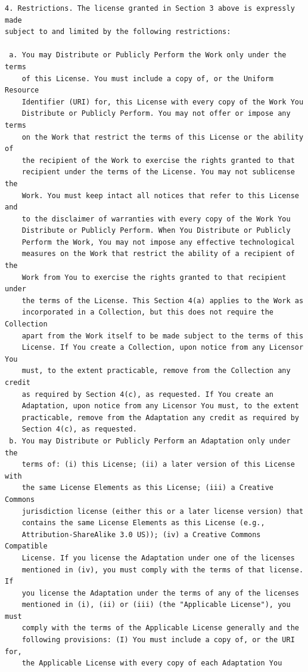 \documentclass[10pt]{book}              %
\begin{document}
\begin{appendices}
\begin{verbatim}
4. Restrictions. The license granted in Section 3 above is expressly made
subject to and limited by the following restrictions:

 a. You may Distribute or Publicly Perform the Work only under the terms
    of this License. You must include a copy of, or the Uniform Resource
    Identifier (URI) for, this License with every copy of the Work You
    Distribute or Publicly Perform. You may not offer or impose any terms
    on the Work that restrict the terms of this License or the ability of
    the recipient of the Work to exercise the rights granted to that
    recipient under the terms of the License. You may not sublicense the
    Work. You must keep intact all notices that refer to this License and
    to the disclaimer of warranties with every copy of the Work You
    Distribute or Publicly Perform. When You Distribute or Publicly
    Perform the Work, You may not impose any effective technological
    measures on the Work that restrict the ability of a recipient of the
    Work from You to exercise the rights granted to that recipient under
    the terms of the License. This Section 4(a) applies to the Work as
    incorporated in a Collection, but this does not require the Collection
    apart from the Work itself to be made subject to the terms of this
    License. If You create a Collection, upon notice from any Licensor You
    must, to the extent practicable, remove from the Collection any credit
    as required by Section 4(c), as requested. If You create an
    Adaptation, upon notice from any Licensor You must, to the extent
    practicable, remove from the Adaptation any credit as required by
    Section 4(c), as requested.
 b. You may Distribute or Publicly Perform an Adaptation only under the
    terms of: (i) this License; (ii) a later version of this License with
    the same License Elements as this License; (iii) a Creative Commons
    jurisdiction license (either this or a later license version) that
    contains the same License Elements as this License (e.g.,
    Attribution-ShareAlike 3.0 US)); (iv) a Creative Commons Compatible
    License. If you license the Adaptation under one of the licenses
    mentioned in (iv), you must comply with the terms of that license. If
    you license the Adaptation under the terms of any of the licenses
    mentioned in (i), (ii) or (iii) (the "Applicable License"), you must
    comply with the terms of the Applicable License generally and the
    following provisions: (I) You must include a copy of, or the URI for,
    the Applicable License with every copy of each Adaptation You

\end{verbatim}
\end{appendices}
\end{document}
